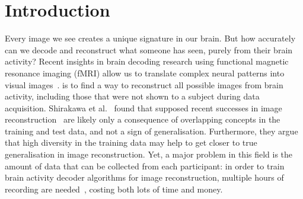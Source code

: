 \chapter{Introduction}\label{introduction}






\noindent{}Every image we see creates a unique signature in our brain. But how accurately can we decode and reconstruct what someone has seen, purely from their brain activity? Recent insights in brain decoding research using functional magnetic resonance imaging (fMRI) allow us to translate complex neural patterns into visual images~\cite{shenDeepImageReconstruction2019,scottiMindEye2SharedSubjectModels2024,ozcelikNaturalSceneReconstruction2023}.   is to find a way to reconstruct all possible images from brain activity, including those that were not shown to a subject during data acquisition. Shirakawa et al.~\cite{shirakawaSpuriousReconstructionBrain2024} found that supposed recent successes in image reconstruction~\cite{ozcelikNaturalSceneReconstruction2023,scottiMindEye2SharedSubjectModels2024} are likely only a consequence of overlapping concepts in the training and test data, and not a sign of generalisation. Furthermore, they argue that high diversity in the training data may help to get closer to true generalisation in image reconstruction. Yet, a major problem in this field is the amount of data that can be collected from each participant: in order to train brain activity decoder algorithms for image reconstruction, multiple hours of recording are needed~\cite{horikawaGenericDecodingSeen2017,gifford7TFMRIDataset2025,hebartTHINGSdataMultimodalCollection2023}, costing both lots of time and money. 

